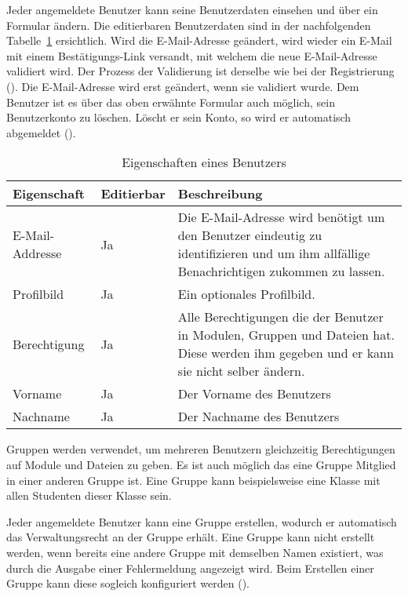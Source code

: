 Jeder angemeldete Benutzer kann seine Benutzerdaten einsehen und über ein Formular ändern. Die editierbaren Benutzerdaten sind in der nachfolgenden Tabelle~\ref{tab:benutzer_eigenschaften} ersichtlich. Wird die E-Mail-Adresse geändert, wird wieder ein E-Mail mit einem Bestätigungs-Link versandt, mit welchem die neue E-Mail-Adresse validiert wird. Der Prozess der Validierung ist derselbe wie bei der Registrierung (). Die E-Mail-Adresse wird erst geändert, wenn sie validiert wurde. 
Dem Benutzer ist es über das oben erwähnte Formular auch möglich, sein Benutzerkonto zu löschen. Löscht er sein Konto, so wird er automatisch abgemeldet ().

\begin{table}[H]
\begin{tabularx}{\textwidth}{|l|l|X|} \hline
\textbf{Eigenschaft} &\textbf{Editierbar} & \textbf{Beschreibung} \\ \hline
E-Mail-Addresse		& Ja 	& Die E-Mail-Adresse wird benötigt um den Benutzer eindeutig zu identifizieren und um ihm allfällige Benachrichtigen zukommen zu lassen.\\ \hline
Profilbild			& Ja 	& Ein optionales Profilbild.\\ \hline
Berechtigung 		& Ja 	& Alle Berechtigungen die der Benutzer in Modulen, Gruppen und Dateien hat. Diese werden ihm gegeben und er kann sie nicht selber ändern.\\ \hline
Vorname 			& Ja 	& Der Vorname des Benutzers\\ \hline
Nachname			& Ja	& Der Nachname des Benutzers\\ \hline
\end{tabularx}
\caption{Eigenschaften eines Benutzers}
\label{tab:benutzer_eigenschaften}
\end{table}

Gruppen werden verwendet, um mehreren Benutzern gleichzeitig Berechtigungen auf Module und Dateien zu geben. Es ist auch möglich das eine Gruppe Mitglied in einer anderen Gruppe ist. Eine Gruppe kann beispielsweise eine Klasse mit allen Studenten dieser Klasse sein.

Jeder angemeldete Benutzer kann eine Gruppe erstellen, wodurch er automatisch das Verwaltungsrecht an der Gruppe erhält. Eine Gruppe kann nicht erstellt werden, wenn bereits eine andere Gruppe mit demselben Namen existiert, was durch die Ausgabe einer Fehlermeldung angezeigt wird.
Beim Erstellen einer Gruppe kann diese sogleich konfiguriert werden ().

